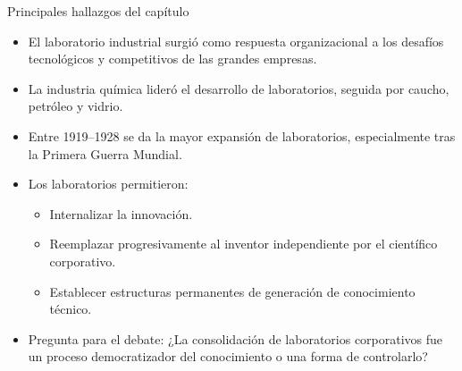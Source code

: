 \documentclass{beamer}
\begin{document}
	\begin{frame}{Principales hallazgos del capítulo}
		\begin{itemize}
			\item El laboratorio industrial surgió como respuesta organizacional a los desafíos tecnológicos y competitivos de las grandes empresas.
			\item La industria química lideró el desarrollo de laboratorios, seguida por caucho, petróleo y vidrio.
			\item Entre 1919–1928 se da la mayor expansión de laboratorios, especialmente tras la Primera Guerra Mundial.
			\item Los laboratorios permitieron:
			\begin{itemize}
				\item Internalizar la innovación.
				\item Reemplazar progresivamente al inventor independiente por el científico corporativo.
				\item Establecer estructuras permanentes de generación de conocimiento técnico.
			\end{itemize}
			\item Pregunta para el debate: ¿La consolidación de laboratorios corporativos fue un proceso democratizador del conocimiento o una forma de controlarlo?
		\end{itemize}
	\end{frame}
	
\end{document}
